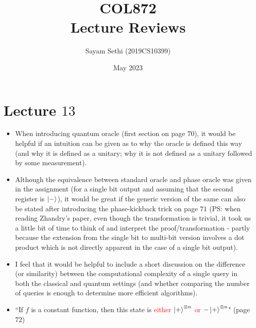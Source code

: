 \documentclass[11pt]{article}
\title{COL872\\Lecture Reviews}
\author{Sayam Sethi (2019CS10399)}
\date{May 2023}
\begin{document}
\maketitle

\tableofcontents


\section{Lecture $13$}
\begin{itemize}
    \item When introducing quantum oracle (first section on page $70$), it would be helpful if an intuition can be given as to why the oracle is defined this way (and why it is defined as a unitary; why it is not defined as a unitary followed by some measurement).
    \item Although the equivalence between standard oracle and phase oracle was given in the assignment (for a single bit output and assuming that the second register is $\ket{-}$), it would be great if the generic version of the same can also be stated after introducing the phase-kickback trick on page $71$ (PS: when reading Zhandry's paper, even though the transformation is trivial, it took us a little bit of time to think of and interpret the proof/transformation - partly because the extension from the single bit to multi-bit version involves a dot product which is not directly apparent in the case of a single bit output).
    \item I feel that it would be helpful to include a short discussion on the difference (or similarity) between the computational complexity of a single query in both the classical and quantum settings (and whether comparing the number of queries is enough to determine more efficient algorithms).
    \item ``If $f$ is a constant function, then this state is \textcolor{red}{either $\ket{+}^{\otimes n}$ or $-\ket{+}^{\otimes n}$}" (page $72$)
\end{itemize}
\end{document}
